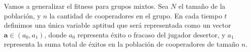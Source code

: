 \documentclass[a4paper,10pt]{article}
\begin{document}
{%
Vamos a generalizar el fitness para grupos mixtos.
Sea $N$ el tamaño de la población, y $n$ la cantidad de cooperadores en el grupo.
En cada tiempo $t$ definimos una única variable aptitud que será representada como un vector $\bm{a} \in (a_0, a_1)$, donde $a_0$ representa éxito o fracaso del jugador desertor, y $a_1$ representa la suma total de éxitos en la población de cooperadores de tamaño $n$.
%     
%     
%     
%     
%     
% 


}
\end{document}
